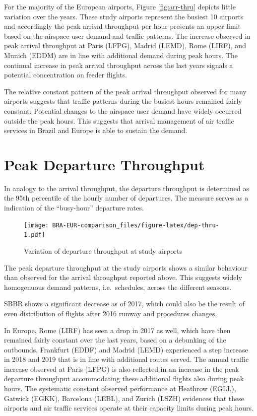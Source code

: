 \documentclass[
]{book}
\begin{document}
For the majority of the European airports, Figure \ref{fig:arr-thru} depicts little variation over the years.
These study airports represent the busiest 10 airports and accordingly the peak arrival throughput per hour presents an upper limit based on the airspace user demand and traffic patterns.
The increase observed in peak arrival throughput at Paris (LFPG), Madrid (LEMD), Rome (LIRF), and Munich (EDDM) are in line with additional demand during peak hours.
The continual increase in peak arrival throughput across the last years signals a potential concentration on feeder flights.

The relative constant pattern of the peak arrival throughput observed for many airports suggests that traffic patterns during the busiest hours remained fairly constant.
Potential changes to the airspace user demand have widely occurred outside the peak hours.
This suggests that arrival management of air traffic services in Brazil and Europe is able to sustain the demand.

\hypertarget{peak-departure-throughput}{%
\section{Peak Departure Throughput}\label{peak-departure-throughput}}

In analogy to the arrival throughput, the departure throughput is determined as the 95th percentile of the hourly number of departures. The measure serves as a indication of the ``busy-hour'' departure rates.



\begin{figure}
\centering
\texttt{[image: BRA-EUR-comparison\_files/figure-latex/dep-thru-1.pdf]}
\caption{\label{fig:dep-thru}Variation of departure throughput at study airports}
\end{figure}

The peak departure throughput at the study airports shows a similar behaviour than observed for the arrival throughput reported above.
This suggests widely homogenuous demand patterns, i.e.~schedules, across the different seasons.

SBBR shows a significant decrease as of 2017, which could also be the result of even distribution of flights after 2016 runway and procedures changes.

In Europe, Rome (LIRF) has seen a drop in 2017 as well, which have then remained fairly constant over the last years, based on a debunking of the outbounds.
Frankfurt (EDDF) and Madrid (LEMD) experienced a step increase in 2018 and 2019 that is in line with additional routes served.
The annual traffic increase observed at Paris (LFPG) is also reflected in an increase in the peak departure throughput accommodating these additional flights also during peak hours.
The systematic constant observed performance at Heathrow (EGLL), Gatwick (EGKK), Barcelona (LEBL), and Zurich (LSZH) evidences that these airports and air traffic services operate at their capacity limits during peak hours.
\end{document}
